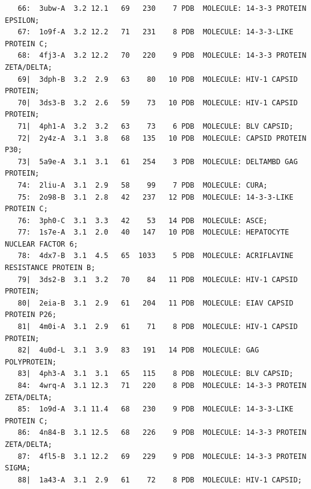 \documentclass{bmcart}
\begin{document}
\begin{verbatim}
   66:  3ubw-A  3.2 12.1   69   230    7 PDB  MOLECULE: 14-3-3 PROTEIN EPSILON;                                    
   67:  1o9f-A  3.2 12.2   71   231    8 PDB  MOLECULE: 14-3-3-LIKE PROTEIN C;                                     
   68:  4fj3-A  3.2 12.2   70   220    9 PDB  MOLECULE: 14-3-3 PROTEIN ZETA/DELTA;                                 
   69|  3dph-B  3.2  2.9   63    80   10 PDB  MOLECULE: HIV-1 CAPSID PROTEIN;                                      
   70|  3ds3-B  3.2  2.6   59    73   10 PDB  MOLECULE: HIV-1 CAPSID PROTEIN;                                      
   71|  4ph1-A  3.2  3.2   63    73    6 PDB  MOLECULE: BLV CAPSID;                                                
   72|  2y4z-A  3.1  3.8   68   135   10 PDB  MOLECULE: CAPSID PROTEIN P30;                                        
   73|  5a9e-A  3.1  3.1   61   254    3 PDB  MOLECULE: DELTAMBD GAG PROTEIN;                                      
   74:  2liu-A  3.1  2.9   58    99    7 PDB  MOLECULE: CURA;                                                      
   75:  2o98-B  3.1  2.8   42   237   12 PDB  MOLECULE: 14-3-3-LIKE PROTEIN C;                                     
   76:  3ph0-C  3.1  3.3   42    53   14 PDB  MOLECULE: ASCE;                                                      
   77:  1s7e-A  3.1  2.0   40   147   10 PDB  MOLECULE: HEPATOCYTE NUCLEAR FACTOR 6;                               
   78:  4dx7-B  3.1  4.5   65  1033    5 PDB  MOLECULE: ACRIFLAVINE RESISTANCE PROTEIN B;                          
   79|  3ds2-B  3.1  3.2   70    84   11 PDB  MOLECULE: HIV-1 CAPSID PROTEIN;                                      
   80|  2eia-B  3.1  2.9   61   204   11 PDB  MOLECULE: EIAV CAPSID PROTEIN P26;                                   
   81|  4m0i-A  3.1  2.9   61    71    8 PDB  MOLECULE: HIV-1 CAPSID PROTEIN;                                      
   82|  4u0d-L  3.1  3.9   83   191   14 PDB  MOLECULE: GAG POLYPROTEIN;                                           
   83|  4ph3-A  3.1  3.1   65   115    8 PDB  MOLECULE: BLV CAPSID;                                                
   84:  4wrq-A  3.1 12.3   71   220    8 PDB  MOLECULE: 14-3-3 PROTEIN ZETA/DELTA;                                 
   85:  1o9d-A  3.1 11.4   68   230    9 PDB  MOLECULE: 14-3-3-LIKE PROTEIN C;                                     
   86:  4n84-B  3.1 12.5   68   226    9 PDB  MOLECULE: 14-3-3 PROTEIN ZETA/DELTA;                                 
   87:  4fl5-B  3.1 12.2   69   229    9 PDB  MOLECULE: 14-3-3 PROTEIN SIGMA;                                      
   88|  1a43-A  3.1  2.9   61    72    8 PDB  MOLECULE: HIV-1 CAPSID;                                              

\end{verbatim}
\end{document}
